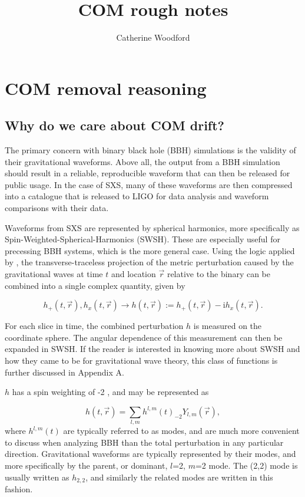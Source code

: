 \documentclass{article}
\title{COM rough notes}
\author{Catherine Woodford}
\begin{document}
\maketitle

\section{COM removal reasoning}

\subsection{Why do we care about COM drift?}
The primary concern with binary black hole (BBH) simulations is the validity of their gravitational waveforms. Above all, the output from a BBH simulation should result in a reliable, reproducible waveform that can then be released for public usage. In the case of SXS, many of these waveforms are then compressed into a catalogue that is released to LIGO for data analysis and waveform comparisons with their data.

Waveforms from SXS are represented by spherical harmonics, more specifically as Spin-Weighted-Spherical-Harmonics (SWSH). These are especially useful for precessing BBH systems, which is the more general case. Using the logic applied by \cite{MB14}, the transverse-traceless projection of the metric perturbation caused by the gravitational waves at time $t$ and location $\vec{r}$ relative to the binary can be combined into a single complex quantity, given by

\begin{equation}
h_{+}(t,\vec{r}), h_{x}(t,\vec{r}) \rightarrow h(t,\vec{r}) := h_{+}(t,\vec{r}) - \textrm{i} h_{x}(t,\vec{r}) .
\end{equation}

For each slice in time, the combined perturbation $h$ is measured on the coordinate sphere. The angular dependence of this measurement can then be expanded in SWSH. If the reader is interested in knowing more about SWSH and how they came to be for gravitational wave theory, this class of functions is further discussed in Appendix A.

$h$ has a spin weighting of -2 \cite{MB14,PA11,ENRP66}, and may be represented as

\begin{equation}
h(t,\vec{r}) = \sum_{l,m} h^{l,m}(t)_{-2}Y_{l,m}(\vec{r}),
\end{equation}
where $h^{l,m}(t)$ are typically referred to as modes, and are much more convenient to discuss when analyzing BBH than the total perturbation in any particular direction. Gravitational waveforms are typically represented by their modes, and more specifically by the parent, or dominant, $l$=2, $m$=2 mode. The (2,2) mode is usually written as $h_{2,2}$, and similarly the related modes are written in this fashion.
\end{document}
